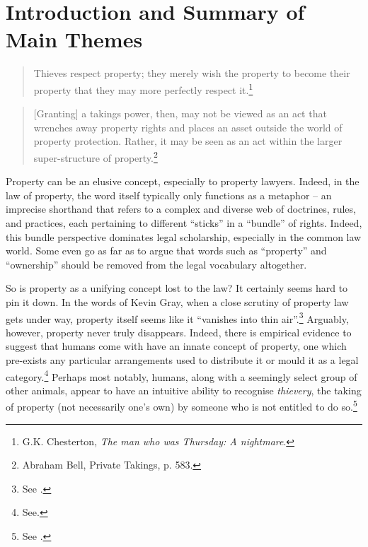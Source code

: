 \chapter{Introduction and Summary of Main Themes}\label{chap:intro}

\begin{quote}
Thieves respect property; they merely wish the property to become their property that they may more perfectly respect it.\footnote{G.K. Chesterton, {\it The man who was Thursday: A nightmare}.}
\end{quote}
\begin{quote}
[Granting] a takings power, then, may not be viewed as an act that wrenches away property rights and places an asset outside the world of property protection. Rather, it may be seen as an act within the larger super-structure of property.\footnote{Abraham Bell, Private Takings, p. 583.}
\end{quote}
%
%
%
%

Property can be an elusive concept, especially to property lawyers. Indeed, in the law of property, the word itself typically only functions as a metaphor -- an imprecise shorthand that refers to a complex and diverse web of doctrines, rules, and practices, each pertaining to different ``sticks'' in a ``bundle'' of rights. Indeed, this bundle perspective dominates legal scholarship, especially in the common law world. Some even go as far as to argue that words such as ``property'' and ``ownership'' should be removed from the legal vocabulary altogether. 

So is property as a unifying concept lost to the law? It certainly seems hard to pin it down. In the words of Kevin Gray, when a close scrutiny of property law gets under way, property itself seems like it ``vanishes into thin air''.\footnote{See \cite[306-307]{gray91}.} Arguably, however, property never truly disappears. Indeed, there is empirical evidence to suggest that humans come with have an innate concept of property, one which pre-exists any particular arrangements used to distribute it or mould it as a legal category.\footnote{See\cite{stake06}.} Perhaps most notably, humans, along with a seemingly select group of other animals, appear to have an intuitive ability to recognise {\it thievery}, the taking of property (not necessarily one's own) by someone who is not entitled to do so.\footnote{See \cite[11-13]{brosnan11}.}

